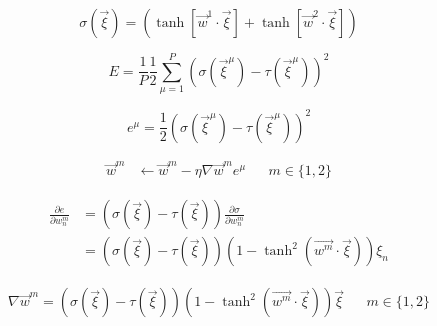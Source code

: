 
\begin{equation}\label{eq:1:sigma}
	\sigma(\vec{\xi}) = (\tanh[\vec{w}^1 \cdot \vec{\xi}] + \tanh[\vec{w}^2 \cdot \vec{\xi}])
\end{equation}

\begin{equation}\label{eq:1:cost}
	E = \frac{1}{P} \frac{1}{2} \sum_{\mu = 1}^P (\sigma(\vec{\xi}^\mu) - \tau(\vec{\xi}^\mu))^2
\end{equation}

\begin{equation}\label{eq:1:contribution}
	e^\mu = \frac{1}{2}(\sigma(\vec{\xi}^\mu) - \tau(\vec{\xi}^\mu))^2
\end{equation}

\begin{align}\label{eq:1:update}
	\vec{w}^m & \leftarrow \vec{w}^m - \eta \nabla \vec{w}^m e^\mu && m \in \{1, 2\}
\end{align}

\begin{align}\label{eq:1:gradient}
	\frac{\partial e}{\partial w_n^m} & = (\sigma(\vec{\xi}) - \tau(\vec{\xi})) \frac{\partial \sigma}{\partial w_n^m} \nonumber \\
	~& = (\sigma(\vec{\xi}) - \tau(\vec{\xi})) (1 - \tanh^2(\vec{w^m} \cdot \vec{\xi})) \xi_n 
\end{align}

\begin{align}\label{eq:1:gradient_vector}
	\nabla \vec{w}^m = (\sigma(\vec{\xi}) - \tau(\vec{\xi})) (1 - \tanh^2(\vec{w^m} \cdot \vec{\xi})) \vec{\xi} && m \in \{1, 2\}
\end{align}

